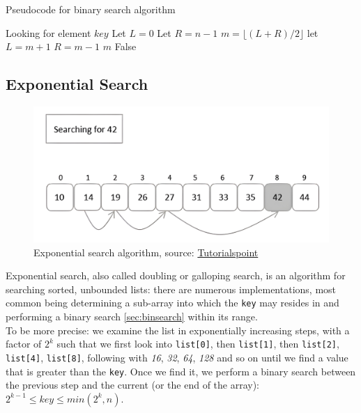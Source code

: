\begin{algorithm}
    \captionsetup{labelsep=newline}
    \caption{Pseudocode for binary search algorithm \label{alg:binsearch}}
    \begin{algorithmic}[1]
        \State Looking for element $key$
        \State Let $L=0$ 
        \State Let $R=n-1$ 
            \State $m=\lfloor (L+R)/2 \rfloor$
                \State let $L=m+1$
                \State $R = m - 1$
            \Else
                \State \Return $m$ 
            \EndIf
        \EndWhile
        \State \Return False 
    \end{algorithmic}
\end{algorithm}

\subsection{Exponential Search \label{sec:expsearch}}

\begin{figure}[H] 
    \begin{center}
        \includegraphics[width=.8\textwidth]{imgs/exponential_search.png}
        \caption{Exponential search algorithm, source: \href{https://www.tutorialspoint.com/data_structures_algorithms/exponential_search.htm}{Tutorialspoint}\label{fig:expsearch}}
    \end{center}
\end{figure}

Exponential search, also called doubling or galloping search, is an algorithm for searching sorted, unbounded lists: there are numerous implementations, most common being determining a sub-array into which the \verb|key| may resides in and performing a binary search \ref{sec:binsearch} within its range.\\
To be more precise: we examine the list in exponentially increasing steps, with a factor of $2^k$ such that we first look into \verb+list[0]+, then \verb+list[1]+, then \verb+list[2]+, \verb+list[4]+, \verb+list[8]+, following with \textit{16}, \textit{32}, \textit{64}, \textit{128} and so on until we find a value that is greater than the \verb|key|. Once we find it, we perform a binary search between the previous step and the current (or the end of the array): $2^{k-1} \leq key \leq min(2^{k},n)$.

